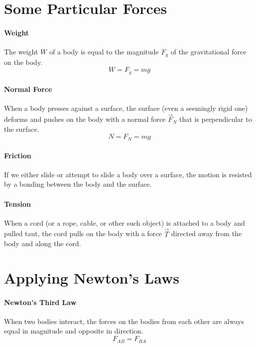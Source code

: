 \documentclass{article}
\begin{document}
    \section{Some Particular Forces}

        \paragraph{Weight}
        The weight $W$ of a body is equal to the magnitude $F_g$ of the gravitational force on the body.
        \begin{equation}
            W = F_g = mg
        \end{equation}

        \paragraph{Normal Force}
        When a body presses against a surface, the surface (even a seemingly rigid one) deforms and pushes on the body with a normal force $\vec{F}_N$ that is perpendicular to the surface.
        \begin{equation}
            N = F_N = mg
        \end{equation}

        \paragraph{Friction}
        If we either slide or attempt to slide a body over a surface, the motion is resisted by a bonding between the body and the surface.

        \paragraph{Tension}
        When a cord (or a rope, cable, or other such object) is attached to a body and pulled taut, the cord pulls on the body with a force $\vec{T}$ directed away from the body and along the cord.

    \section{Applying Newton's Laws}

        \paragraph{Newton's Third Law}
        When two bodies interact, the forces on the bodies from each other are always equal in magnitude and opposite in direction.
        \begin{equation}
            F_{AB} = F_{BA}
        \end{equation}
\end{document}
